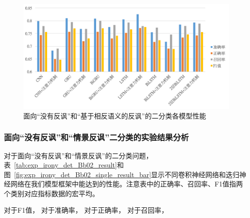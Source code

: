 \begin{figure}[H]
  \centering
  \includegraphics[width=\textwidth]{img/exp_irony_det_Bb01_single_result_bar.png}
  \caption{面向“没有反讽”和“基于相反语义的反讽”的二分类各模型性能}
  \label{fig:exp_irony_det_Bb01_single_result_bar}
\end{figure}

\subsubsection{面向“没有反讽”和“情景反讽”二分类的实验结果分析}

对于面向“没有反讽”和“情景反讽”的二分类问题，表~\ref{tab:exp_irony_det_Bb02_result}和图~\ref{fig:exp_irony_det_Bb02_single_result_bar}显示不同卷积神经网络和迭归神经网络在我们模型框架中能达到的性能。注意表中的正确率、召回率、F1值指两个类别对应指标数据的宏平均。

对于F1值，
对于准确率，
对于正确率，
对于召回率，


